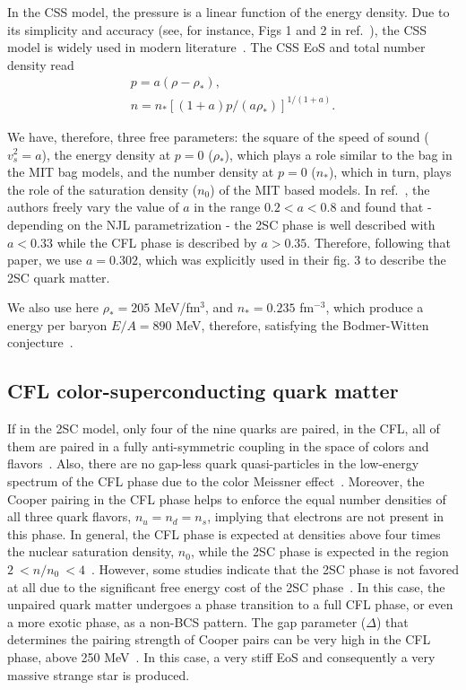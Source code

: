 \documentclass[%
reprint,
superscriptaddress,
nofootinbib,
amsmath,
amssymb,
aps,
floatfix,
showkeys,
]{revtex4-2}
\begin{document}
In the CSS model, the pressure is a linear function of the energy density. Due to its simplicity and accuracy (see, for instance, Figs 1 and 2 in ref.~\cite{Zdunik2013}), the CSS model is widely used in modern literature~\cite{Zdunik2013, Alford2013, Alford2015, Burgio2016, Han2019, Cierniak_2020, Sun2023, Lopes2023JCAP}. The CSS EoS and total number density read
\begin{eqnarray}
p = a(\rho - \rho_{*}),  \nonumber \\ \label{2SCEOS}
n = n_{*}[(1 +a)p/(a\rho_{*})]^{1/(1+a)} .
\end{eqnarray}

We have, therefore, three free parameters: the square of the speed of sound ($v_s^2 = a$), the energy density at $p=0$ ($\rho_*$), which plays a role similar to the bag in the MIT bag models, and the number density at $p = 0$ ($n_*$),  which in turn, plays the role of the saturation density ($n_0$) of the MIT based models. In ref.~\cite{Zdunik2013}, the authors freely vary the value of $a$ in the range $0.2 < a < 0.8$  and found that - depending on the NJL parametrization - the 2SC phase is well described with $a < 0.33$ while the CFL phase is described by $a > 0.35$.  Therefore, following that paper, we use $a = 0.302$, which was explicitly used in their fig. 3 to describe the 2SC quark matter.

We also use here $\rho_* = 205$ MeV/fm$^{3}$, and $n_* = 0.235$ fm$^{-3}$, which produce a energy per baryon $E/A = 890$ MeV, therefore, satisfying the Bodmer-Witten conjecture~\cite{Bodmer_1971,Witten_1984}.
\subsection{CFL color-superconducting quark matter}
If in the 2SC model, only four of the nine quarks are paired, in the CFL, all of them are paired in a fully anti-symmetric coupling in the space of colors and flavors~\cite{Alford2008}. Also, there are no gap-less quark quasi-particles in the low-energy spectrum of the CFL phase due to the color Meissner effect~\cite{Shovkovy_2005}. Moreover, the Cooper pairing in the CFL phase helps to enforce the equal number densities of all three quark flavors, $n_u = n_d = n_s$, implying that electrons are not present in this phase. In general, the CFL phase is expected at densities above four times the nuclear saturation density, $n_0$, while the 2SC phase is expected in the region $2~<n/n_0~<4$~\cite{Zdunik2013}. However, some studies indicate that the 2SC phase is not favored at all due to the significant free energy cost of the 2SC phase~\cite{Alford2002}. In this case, the unpaired quark matter undergoes a phase transition to a full CFL phase, or even a more exotic phase, as a non-BCS pattern. The gap parameter ($\Delta$) that determines the pairing strength of Cooper pairs can be very high in the CFL phase, above 250 MeV~\cite{Lugones2004}. In this case, a very stiff EoS and consequently a very massive strange star is produced.
\end{document}
